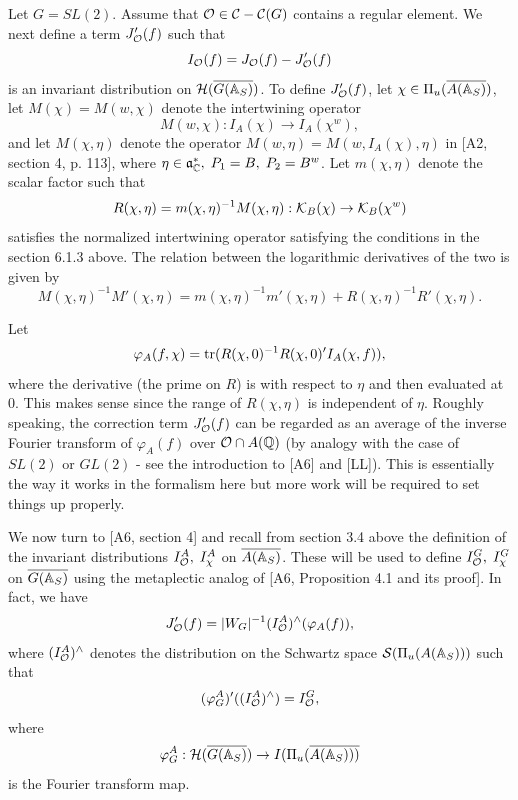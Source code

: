 Let $G=SL(2)$. Assume that
${\cal{O}}\in {\cal{C}}-{\cal{C}}(G)$
contains a regular element.
We next define a term $J_{{\cal{O}}}^{\prime }(f)$
such that 
\begin{equation}
I_{{\cal{O}}}(f)=J_{{\cal{O}}}(f)-J_{{\cal{O}}}^{\prime }(f)
\end{equation}
is an invariant distribution on ${\cal{H}}(\overline{G({\Bbb{A}}_S)})$.
To define $J_{\cal{O}}^{\prime }(f)$, let
$\chi \in \Pi _u(\overline{A({\Bbb{A}}_S)})$, let
$M(\chi )=M(w,\chi)$ denote the intertwining operator
\[
M(w,\chi):I_A(\chi )\rightarrow I_A(\chi ^w),
\]
and let $M(\chi ,\eta )$ denote the operator
$M(w,\eta )=M(w,I_A(\chi ),\eta)$ in [A2, section 4, p. 113],
where $\eta \in {\frak {a}}_{{\Bbb {C}}}^{*},\;P_1=B,\;P_2=B^w$.
Let $m(\chi ,\eta )$ denote the scalar factor such that 
\begin{equation}
R(\chi ,\eta )=m(\chi ,\eta )^{-1}M(\chi ,\eta ):
{\cal K}_B(\chi )\rightarrow {\cal K}_B(\chi ^w)
\end{equation}
satisfies the normalized intertwining operator satisfying the conditions in
the section 6.1.3 above. The relation between the logarithmic
derivatives of the two is given by
\begin{equation}
M(\chi ,\eta )^{-1}M'(\chi ,\eta )=
m(\chi ,\eta )^{-1}m'(\chi ,\eta )+
R(\chi ,\eta )^{-1}R'(\chi ,\eta ).
\end{equation}

Let 
\begin{equation}
\varphi _A(f,\chi )
={\rm tr}(R(\chi ,0)^{-1}R(\chi ,0)^{\prime }I_A(\chi ,f)),
\end{equation}
where the derivative (the prime on $R$) is with respect to $\eta $ and then
evaluated at $0$. This makes sense since the range of $R(\chi ,\eta )$ is
independent of $\eta $.
Roughly speaking, the correction term $J_{\cal{O}}^{\prime }(f)$ can be
regarded as an average of the inverse Fourier transform of $\varphi _A(f)$
over ${\cal{O}}\cap A({\Bbb{Q}})$
(by analogy with the case of $SL(2)$ or $GL(2)$
- see the introduction to [A6] and [LL]). This is
essentially the way
it works in the formalism here but more work will be required to set things
up properly.

We now turn to [A6, section 4] and recall from section 3.4 above  the
definition of the invariant distributions
$I_{{\cal{O}}}^A,\;I_\chi ^A$ on $\overline{A({\Bbb{A}}_S)}$.
These will be used to define $I_{{\cal{O}}}^G,\;I_\chi ^G$ on 
$\overline{G({\Bbb{A}}_S)}$ using the metaplectic analog of
[A6, Proposition 4.1 and its proof]. In fact, we
have 
\begin{equation}
J_{{\cal{O}}}^{\prime }(f)
=|W_G|^{-1}(I_{{\cal{O}}}^A)^{\wedge }(\varphi_A(f)),
\end{equation}
where $(I_{{\cal{O}}}^A)^{\wedge }$ denotes the distribution on the
Schwartz space ${\cal{S}}(\Pi _u(A({\Bbb {A}}_S)))$ such that 
\[
(\varphi _G^A)^{\prime }((I_{\cal{O}}^A)^{\wedge })=I_{\cal{O}}^G, 
\]
where 
\[
\varphi_G^A:{\cal{H}}(\overline{G({\Bbb {A}}_S)})\rightarrow
I(\Pi _u(\overline{A({\Bbb {A}_S)})) }
\]
is the Fourier transform map.

